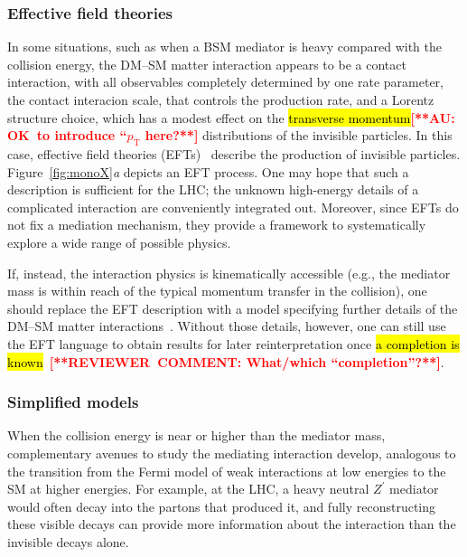 \documentclass{ar-1col}
\newcommand{\IP}{invisible particle}
\newcommand{\Zprime}{\ensuremath{{Z}^\prime}\xspace}
\begin{document}
\subsubsection{Effective field theories}\label{sub:EFT}

In some situations, such as when a BSM mediator is heavy compared
with the collision energy, the DM--SM matter interaction appears to be a
contact interaction, with all observables completely determined by
one rate parameter, the contact interacion scale, that controls
the production rate, and a Lorentz structure choice, which has a
modest effect on the \hl{transverse momentum}\textbf{\textcolor{red}{[**AU: OK\ to introduce ``$p_{\mathrm {T}}$ here?**]}} distributions of the
{\IP}s. In this case, effective field theories
(EFTs)~\cite{Goodman:2010ku,Bai:2010hh,Fox:2011pm} describe the production of {\IP}s. Figure~\ref{fig:monoX}\textit{a} depicts an EFT
process. One may
hope that such a description is sufficient for the LHC; the
unknown high-energy details of a complicated interaction are
conveniently integrated out. Moreover, since EFTs do not fix a
mediation mechanism, they provide a framework to systematically
explore a wide range of possible physics.

If, instead, the interaction physics is kinematically accessible
(e.g., the mediator mass is within reach of the typical momentum
transfer in the collision), one should replace the EFT description
with a model specifying further details of the DM--SM matter
interactions~\cite{Shoemaker:2011vi}. Without those details,
however, one can still use the EFT language to obtain results for
later reinterpretation once \hl{a completion is
known}~\textbf{\textcolor{red}{[**REVIEWER\ COMMENT: What/which ``completion''?**]}}\cite{Racco:2015dxa,Busoni:2013lha}.

\subsubsection{Simplified models}\label{sub:simplifiedModels}

When the collision energy is near or higher than the mediator
mass, complementary avenues to study the mediating interaction
develop, analogous to the transition from the Fermi model of weak
interactions at low energies to the SM at higher
energies. For example, at the LHC, a heavy neutral \Zprime
mediator would often decay into the partons that produced it, and
fully reconstructing these visible decays can provide more
information about the interaction than the invisible decays alone.
\end{document}
